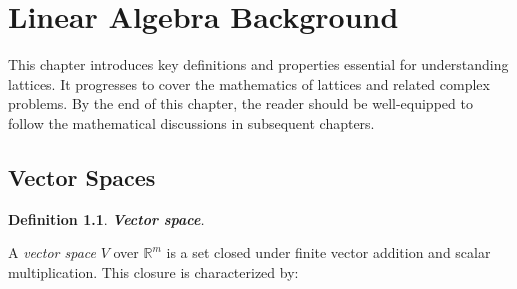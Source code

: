 \documentclass[a4paper,12pt]{report}
\newtheorem{definition}{Definition}[section]
\newcommand{\R}{\mathbb{R}}
\begin{document}
% 
% 

\chapter{Linear Algebra Background}

This chapter introduces key definitions and properties essential for understanding lattices. It progresses to cover the mathematics of lattices and related complex problems. By the end of this chapter, the reader should be well-equipped to follow the mathematical discussions in subsequent chapters.

\section{Vector Spaces}

\begin{definition}
    \textbf{Vector space}.
\end{definition}
A \textit{vector space} $V$ over $\R^{m}$ is a set closed under finite vector addition and scalar multiplication. This closure is characterized by:
\end{document}
